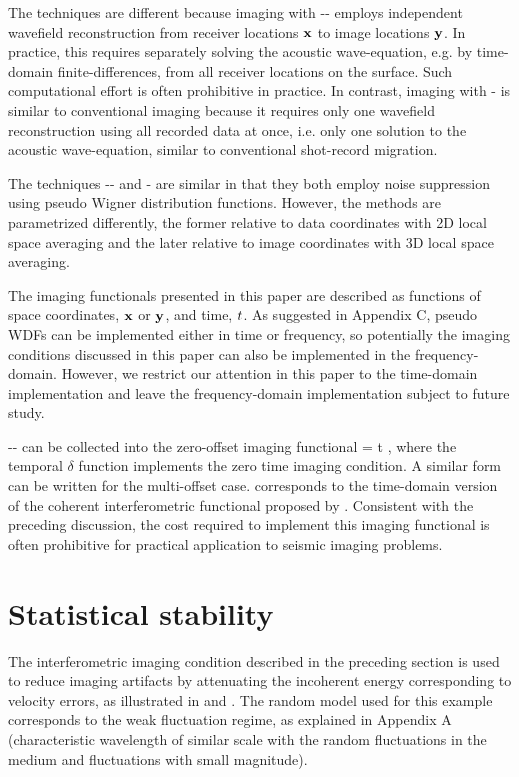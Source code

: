 The techniques are different because imaging with
-- employs independent wavefield
reconstruction from receiver locations ${\mathbf{x}}$ to image locations
${\mathbf{y}}$. In practice, this requires separately solving the acoustic
wave-equation, e.g. by time-domain finite-differences, from all
receiver locations on the surface. Such computational effort is often
prohibitive in practice. In contrast, imaging with
- is similar to conventional imaging
because it requires only one wavefield reconstruction using all
recorded data at once, i.e. only one solution to the acoustic
wave-equation, similar to conventional shot-record migration.

The techniques -- and -
are similar in that they both employ noise suppression using pseudo
Wigner distribution functions. However, the methods are parametrized
differently, the former relative to data coordinates with 2D local
space averaging and the later relative to image coordinates with 3D
local space averaging.

The imaging functionals presented in this paper are described as
functions of space coordinates, ${\mathbf{x}}$ or ${\mathbf{y}}$, and time, ${t}$. As
suggested in Appendix C, pseudo WDFs can be implemented either in time
or frequency, so potentially the imaging conditions discussed in this
paper can also be implemented in the frequency-domain. However, we
restrict our attention in this paper to the time-domain implementation
and leave the frequency-domain implementation subject to future study.

-- can be collected into the zero-offset 
imaging functional
%
\beq \label{eqn:cint} 
 = \delta\lp t\rp 
\intxm \intth \intxh 
\lb {}
\rb \;, 
\eeq 
%
where the temporal $\delta$ function implements the zero time imaging
condition. A similar form can be written for the multi-offset
case.  corresponds to the time-domain version of the
coherent interferometric functional proposed by
\cite{Borcea.IP.2006,Borcea.GEO.2006,Borcea.Multiscale.2006}. Consistent
with the preceding discussion, the cost required to implement this
imaging functional is often prohibitive for practical application to
seismic imaging problems.

\section{Statistical stability}
The interferometric imaging condition described in the preceding
section is used to reduce imaging artifacts by attenuating the
incoherent energy corresponding to velocity errors, as illustrated in
 and . The random model used
for this example corresponds to the weak fluctuation regime, as
explained in Appendix A (characteristic wavelength of similar scale
with the random fluctuations in the medium and fluctuations with small
magnitude).

